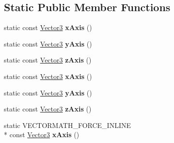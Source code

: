 \subsection*{Static Public Member Functions}
\begin{DoxyCompactItemize}
\item 
\hypertarget{class_vectormath_1_1_aos_1_1_vector3_ad2c5a19c52b39f4e8ba6e9a5ee21e5d0}{static const \hyperlink{class_vectormath_1_1_aos_1_1_vector3}{Vector3} {\bfseries x\+Axis} ()}\label{class_vectormath_1_1_aos_1_1_vector3_ad2c5a19c52b39f4e8ba6e9a5ee21e5d0}

\item 
\hypertarget{class_vectormath_1_1_aos_1_1_vector3_a82fec2cfd5afda33400e288ea8e1c73d}{static const \hyperlink{class_vectormath_1_1_aos_1_1_vector3}{Vector3} {\bfseries y\+Axis} ()}\label{class_vectormath_1_1_aos_1_1_vector3_a82fec2cfd5afda33400e288ea8e1c73d}

\item 
\hypertarget{class_vectormath_1_1_aos_1_1_vector3_a0524b99b228733196b3156ad6d32cd61}{static const \hyperlink{class_vectormath_1_1_aos_1_1_vector3}{Vector3} {\bfseries z\+Axis} ()}\label{class_vectormath_1_1_aos_1_1_vector3_a0524b99b228733196b3156ad6d32cd61}

\item 
\hypertarget{class_vectormath_1_1_aos_1_1_vector3_adb14735bfe8dfe9a47d40101df2d6bac}{static const \hyperlink{class_vectormath_1_1_aos_1_1_vector3}{Vector3} {\bfseries x\+Axis} ()}\label{class_vectormath_1_1_aos_1_1_vector3_adb14735bfe8dfe9a47d40101df2d6bac}

\item 
\hypertarget{class_vectormath_1_1_aos_1_1_vector3_a294d0afafac74a08da052b0634933c8d}{static const \hyperlink{class_vectormath_1_1_aos_1_1_vector3}{Vector3} {\bfseries y\+Axis} ()}\label{class_vectormath_1_1_aos_1_1_vector3_a294d0afafac74a08da052b0634933c8d}

\item 
\hypertarget{class_vectormath_1_1_aos_1_1_vector3_adb1dcbe829b75d5a1b6e57e7dc283394}{static const \hyperlink{class_vectormath_1_1_aos_1_1_vector3}{Vector3} {\bfseries z\+Axis} ()}\label{class_vectormath_1_1_aos_1_1_vector3_adb1dcbe829b75d5a1b6e57e7dc283394}

\item 
\hypertarget{class_vectormath_1_1_aos_1_1_vector3_ad0e9d557df8c430a702cc2358c6f7014}{static V\+E\+C\+T\+O\+R\+M\+A\+T\+H\+\_\+\+F\+O\+R\+C\+E\+\_\+\+I\+N\+L\+I\+N\+E \\*
const \hyperlink{class_vectormath_1_1_aos_1_1_vector3}{Vector3} {\bfseries x\+Axis} ()}\label{class_vectormath_1_1_aos_1_1_vector3_ad0e9d557df8c430a702cc2358c6f7014}


\end{DoxyCompactItemize}
